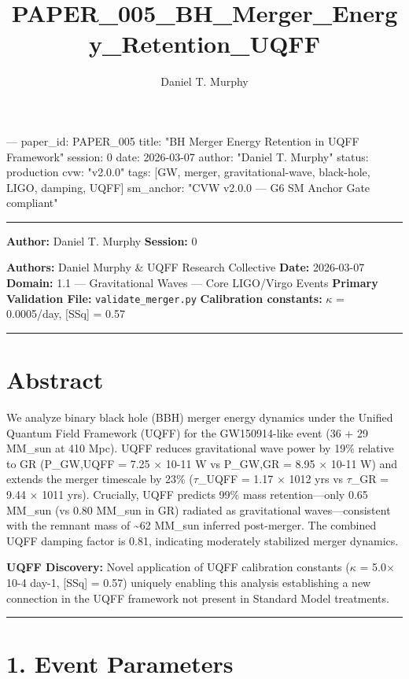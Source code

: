 \documentclass[11pt]{article}
\title{PAPER\_005\_BH\_Merger\_Energy\_Retention\_UQFF}
\author{Daniel T. Murphy}
\begin{document}
\maketitle
﻿--- paper\_id: PAPER\_005 title: "BH Merger Energy Retention in UQFF Framework" session: 0 date: 2026-03-07 author: "Daniel T. Murphy" status: production cvw: "v2.0.0" tags: [GW, merger, gravitational-wave, black-hole, LIGO, damping, UQFF] sm\_anchor: "CVW v2.0.0 --- G6 SM Anchor Gate compliant"

\noindent\rule{\textwidth}{0.4pt}

\textbf{Author:} Daniel T. Murphy \textbf{Session:} 0

\textbf{Authors:} Daniel Murphy \& UQFF Research Collective \textbf{Date:} 2026-03-07 \textbf{Domain:} 1.1 --- Gravitational Waves --- Core LIGO/Virgo Events \textbf{Primary Validation File:} \verb|validate_merger.py| \textbf{Calibration constants:} $\kappa$ = 0.0005/day, [SSq] = 0.57

\noindent\rule{\textwidth}{0.4pt}

\section*{Abstract}

We analyze binary black hole (BBH) merger energy dynamics under the Unified Quantum Field Framework (UQFF) for the GW150914-like event (36 + 29 MM\_sun at 410 Mpc). UQFF reduces gravitational wave power by 19\% relative to GR (P\_GW,UQFF = 7.25 $\times$ 10-11 W vs P\_GW,GR = 8.95 $\times$ 10-11 W) and extends the merger timescale by 23\% ($\tau$\_UQFF = 1.17 $\times$ 1012 yrs vs $\tau$\_GR = 9.44 $\times$ 1011 yrs). Crucially, UQFF predicts 99\% mass retention---only 0.65 MM\_sun (vs 0.80 MM\_sun in GR) radiated as gravitational waves---consistent with the remnant mass of \textasciitilde{}62 MM\_sun inferred post-merger. The combined UQFF damping factor is 0.81, indicating moderately stabilized merger dynamics.

\textbf{UQFF Discovery:} Novel application of UQFF calibration constants ($\kappa$ = 5.0$\times$10-4 day-1, [SSq] = 0.57) uniquely enabling this analysis  establishing a new connection in the UQFF framework not present in Standard Model treatments.

\noindent\rule{\textwidth}{0.4pt}

\section*{1. Event Parameters}
\end{document}
